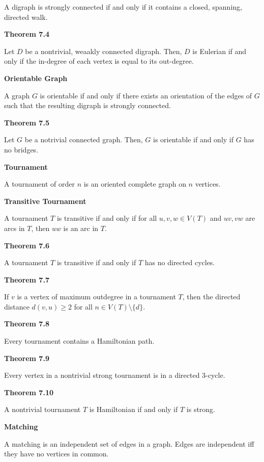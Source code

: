 \documentclass{article}
\begin{document}
    A digraph is strongly connected if and only if it contains a closed, spanning, directed walk.

\medskip\noindent\textbf{Theorem 7.4}

    Let $D$ be a nontrivial, weaakly connected digraph.
    Then, $D$ is Eulerian if and only if the in-degree of each vertex is equal to its out-degree.

\medskip\noindent\textbf{Orientable Graph}

	A graph $G$ is orientable if and only if there exists an orientation of the edges of $G$ such that the resulting digraph is strongly connected.

\medskip\noindent\textbf{Theorem 7.5}

	Let $G$ be a notrivial connected graph.
	Then, $G$ is orientable if and only if $G$ has no bridges.

\medskip\noindent\textbf{Tournament}

	A tournament of order $n$ is an oriented complete graph on $n$ vertices.

\medskip\noindent\textbf{Transitive Tournament}

	A tournament $T$ is transitive if and only if for all $u,v,w \in V(T)$ and $uv,vw$ are arcs in $T$, then $uw$ is an arc in $T$.

\medskip\noindent\textbf{Theorem 7.6}

	A tournament $T$ is transitive if and only if $T$ has no directed cycles.

\medskip\noindent\textbf{Theorem 7.7}

	If $v$ is a vertex of maximum outdegree in a tournament $T$, then the directed distance $d(v, u) \geq 2$ for all $n \in V(T) \setminus \{d\}$.

\medskip\noindent\textbf{Theorem 7.8}

	Every tournament contains a Hamiltonian path.

\medskip\noindent\textbf{Theorem 7.9}

	Every vertex in a nontrivial strong tournament is in a directed 3-cycle.

\medskip\noindent\textbf{Theorem 7.10}

	A nontrivial tournament $T$ is Hamiltonian if and only if $T$ is strong.

\medskip\noindent\textbf{Matching}

	A matching is an independent set of edges in a graph. Edges are independent iff they have no vertices in common.
\end{document}
